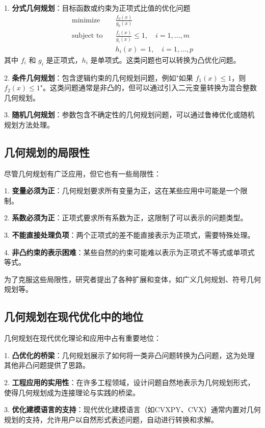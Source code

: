 \documentclass[12pt,a4paper]{book}
\begin{document}
1. \textbf{分式几何规划}：目标函数或约束为正项式比值的优化问题
   $$
   \begin{aligned}
   \text{minimize} \quad & \frac{f_0(x)}{g_0(x)} \\
   \text{subject to} \quad & \frac{f_i(x)}{g_i(x)} \leq 1, \quad i = 1, \dots, m \\
   & h_i(x) = 1, \quad i = 1, \dots, p
   \end{aligned}
   $$
   其中 $f_i$ 和 $g_i$ 是正项式，$h_i$ 是单项式。这类问题也可以转换为凸优化问题。

2. \textbf{条件几何规划}：包含逻辑约束的几何规划问题，例如"如果 $f_1(x) \leq 1$，则 $f_2(x) \leq 1$"。这类问题通常是非凸的，但可以通过引入二元变量转换为混合整数几何规划。

3. \textbf{随机几何规划}：参数包含不确定性的几何规划问题，可以通过鲁棒优化或随机规划方法处理。

\subsection{几何规划的局限性}

尽管几何规划有广泛应用，但它也有一些局限性：

1. \textbf{变量必须为正}：几何规划要求所有变量为正，这在某些应用中可能是一个限制。

2. \textbf{系数必须为正}：正项式要求所有系数为正，这限制了可以表示的问题类型。

3. \textbf{不能直接处理负项}：两个正项式的差不能直接表示为正项式，需要特殊处理。

4. \textbf{非凸约束的表示困难}：某些自然的约束可能难以表示为正项式不等式或单项式等式。

为了克服这些局限性，研究者提出了各种扩展和变体，如广义几何规划、符号几何规划等。

\subsection{几何规划在现代优化中的地位}

几何规划在现代优化理论和应用中占有重要地位：

1. \textbf{凸优化的桥梁}：几何规划展示了如何将一类非凸问题转换为凸问题，这为处理其他非凸问题提供了思路。

2. \textbf{工程应用的实用性}：在许多工程领域，设计问题自然地表示为几何规划形式，使得几何规划成为连接理论与实践的桥梁。

3. \textbf{优化建模语言的支持}：现代优化建模语言（如CVXPY、CVX）通常内置对几何规划的支持，允许用户以自然形式表述问题，自动进行转换和求解。
\end{document}
